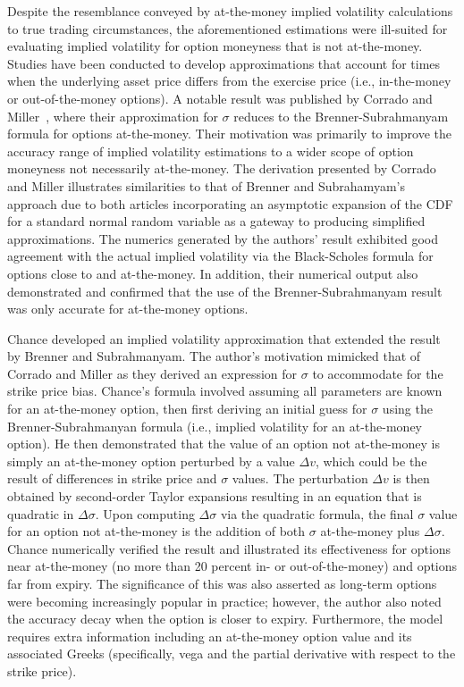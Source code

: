 Despite the resemblance conveyed by at-the-money implied volatility calculations to true trading circumstances, the aforementioned estimations were ill-suited for evaluating implied volatility for option moneyness that is not at-the-money. Studies have been conducted to develop approximations that account for times when the underlying asset price differs from the exercise price (i.e., in-the-money or out-of-the-money options). A notable result was published by Corrado and Miller~\cite{Corrado1996}, where their approximation for $\sigma$ reduces to the Brenner-Subrahmanyam formula for options at-the-money. Their motivation was primarily to improve the accuracy range of implied volatility estimations to a wider scope of option moneyness not necessarily at-the-money. The derivation presented by Corrado and Miller illustrates similarities to that of Brenner and Subrahamyam's approach due to both articles incorporating an asymptotic expansion of the CDF for a standard normal random variable as a gateway to producing simplified approximations. The numerics generated by the authors' result exhibited good agreement with the actual implied volatility via the Black-Scholes formula for options close to and at-the-money. In addition, their numerical output also demonstrated and confirmed that the use of the Brenner-Subrahmanyam result was only accurate for at-the-money options.

Chance \cite{Chance1996} developed an implied volatility approximation that extended the result by Brenner and Subrahmanyam. The author's motivation mimicked that of Corrado and Miller as they derived an expression for $\sigma$ to accommodate for the strike price bias. Chance's formula involved assuming all parameters are known for an at-the-money option, then first deriving an initial guess for $\sigma$ using the Brenner-Subrahmanyan formula (i.e., implied volatility for an at-the-money option). He then demonstrated that the value of an option not at-the-money is simply an at-the-money option perturbed by a value $\Delta v$, which could be the result of differences in strike price and $\sigma$ values. The perturbation $\Delta v$ is then obtained by second-order Taylor expansions resulting in an equation that is quadratic in $\Delta \sigma$. Upon computing $\Delta \sigma$ via the quadratic formula, the final $\sigma$ value for an option not at-the-money is the addition of both $\sigma$ at-the-money plus $\Delta \sigma$. Chance numerically verified the result and illustrated its effectiveness for options near at-the-money (no more than 20 percent in- or out-of-the-money) and options far from expiry. The significance of this was also asserted as long-term options were becoming increasingly popular in practice; however, the author also noted the accuracy decay when the option is closer to expiry. Furthermore, the model requires extra information including an at-the-money option value and its associated Greeks (specifically, vega and the partial derivative with respect to the strike price).

